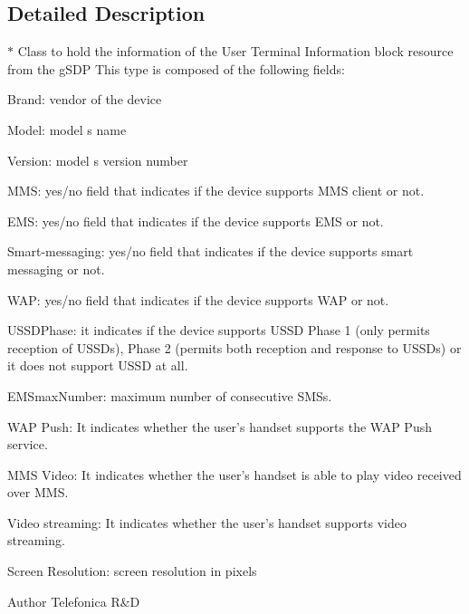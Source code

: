 \subsection{Detailed Description}
$\ast$ Class to hold the information of the User Terminal Information block resource from the gSDP This type is composed of the following fields: 
\begin{DoxyItemize}
\item Brand: vendor of the device 
\item Model: model s name 
\item Version: model s version number 
\item MMS: yes/no field that indicates if the device supports MMS client or not. 
\item EMS: yes/no field that indicates if the device supports EMS or not. 
\item Smart-\/messaging: yes/no field that indicates if the device supports smart messaging or not. 
\item WAP: yes/no field that indicates if the device supports WAP or not. 
\item USSDPhase: it indicates if the device supports USSD Phase 1 (only permits reception of USSDs), Phase 2 (permits both reception and response to USSDs) or it does not support USSD at all. 
\item EMSmaxNumber: maximum number of consecutive SMSs. 
\item WAP Push: It indicates whether the user's handset supports the WAP Push service.  
\item MMS Video: It indicates whether the user's handset is able to play video received over MMS.  
\item Video streaming: It indicates whether the user's handset supports video streaming. 
\item Screen Resolution: screen resolution in pixels 
\end{DoxyItemize}

\begin{DoxyAuthor}{Author}
Telefonica R\&D 
\end{DoxyAuthor}


